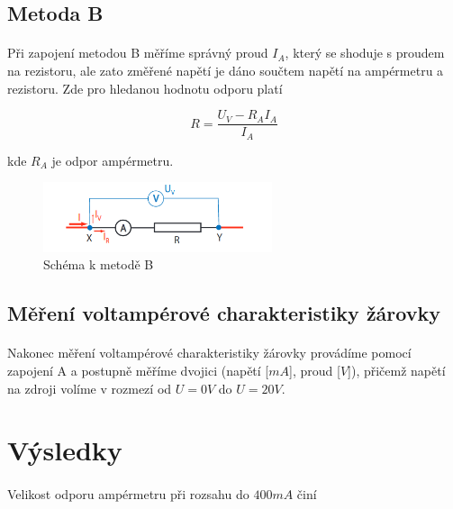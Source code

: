 \documentclass[a4paper,11pt]{article}
\begin{document}
    \subsection{Metoda B}

        \paragraph{} Při zapojení metodou B měříme správný proud $I_{A}$, který se shoduje
        s proudem na rezistoru, ale zato změřené napětí je dáno součtem napětí na ampérmetru
        a rezistoru. Zde pro hledanou hodnotu odporu platí

        \begin{equation}
            R = \frac{U_{V} - R_{A} I_{A}}{I_{A}}
        \end{equation}

        kde $R_{A}$ je odpor ampérmetru.
        
        \begin{figure}[h]
            \centering
            \includegraphics[width=0.6\textwidth]{metoda_b.png}
            \caption{Schéma k metodě B}
            \label{fig:method_b}
        \end{figure}

    \subsection{Měření voltampérové charakteristiky žárovky}

        \paragraph{} Nakonec měření voltampérové charakteristiky žárovky provádíme
        pomocí zapojení A a postupně měříme dvojici (napětí [$mA$], proud [$V$]), přičemž 
        napětí na zdroji volíme v rozmezí od $U = 0V$ do $U = 20V$. 

\section{Výsledky}

    \paragraph{} Velikost odporu ampérmetru při rozsahu do $400 mA$ činí
\end{document}
